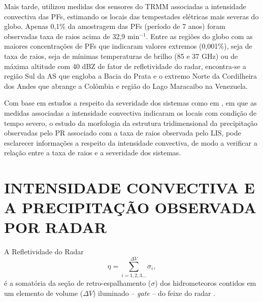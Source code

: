 Mais tarde,  utilizou medidas dos sensores do TRMM associadas a intensidade convectiva das PFs, estimando os locais das tempestades elétricas mais severas do globo. Apenas 0,1\% da amostragem das PFs (período de 7 anos) foram observadas taxa de raios acima de 32,9 min$^{-1}$.  Entre as regiões do globo com as maiores concentrações de PFs que indicaram valores extremos (0,001\%), seja de taxa de raios, seja de mínimas temperaturas de brilho (85 e 37 GHz) ou de máxima altitude com 40 dBZ de fator de refletividade do radar, encontra-se a região Sul da AS que engloba a Bacia do Prata e o extremo Norte da Cordilheira dos Andes que abrange a Colômbia e região do Lago Maracaibo na Venezuela. 

Com base em estudos a respeito da severidade dos sistemas como em , em que as medidas  associadas a intensidade convectiva indicaram os locais com condição de tempo severo, o estudo da morfologia da estrutura tridimensional da precipitação observadas pelo PR associado com a taxa de raios observada pelo LIS, pode esclarecer informações a respeito da intensidade convectiva, de modo a verificar a relação entre a taxa de raios e a severidade dos sistemas. 


\section{INTENSIDADE CONVECTIVA E A PRECIPITAÇÃO OBSERVADA POR RADAR}
\label{introRadar}

A Refletividade do Radar %
\begin{equation}
\eta = \sum_{i=1, 2, 3 ... }^{\Delta V} \sigma_i,
\label{refletividade}
\end{equation}
é a somatória da seção de retro-espalhamento ($\sigma$) dos hidrometeoros contidos em um elemento de volume ($\Delta V$) iluminado -- \textit{gate} -- do feixe do radar \cite{battan1973}.


